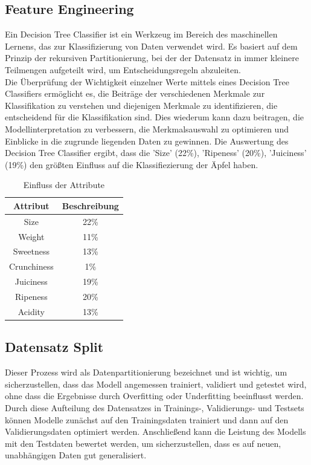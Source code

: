 \documentclass{article}
\begin{document}
\subsection{Feature Engineering}
Ein Decision Tree Classifier ist ein Werkzeug im Bereich des maschinellen Lernens, das zur Klassifizierung von Daten verwendet wird. Es basiert auf dem Prinzip der rekursiven Partitionierung, bei der der Datensatz in immer kleinere Teilmengen aufgeteilt wird, um Entscheidungsregeln abzuleiten.\\ 
Die Überprüfung der Wichtigkeit einzelner Werte mittels eines Decision Tree Classifiers ermöglicht es, die Beiträge der verschiedenen Merkmale zur Klassifikation zu verstehen und diejenigen Merkmale zu identifizieren, die entscheidend für die Klassifikation sind. Dies wiederum kann dazu beitragen, die Modellinterpretation zu verbessern, die Merkmalsauswahl zu optimieren und Einblicke in die zugrunde liegenden Daten zu gewinnen. Die Auswertung des Decision Tree Classifier ergibt, dass die 'Size' (22\%), 'Ripeness' (20\%), 'Juiciness' (19\%) den größten Einfluss auf die Klassifiezierung der Äpfel haben. 
\begin{table}[h]
\centering
\begin{tabular}{|c|c|}
\hline
\textbf{Attribut} & \textbf{Beschreibung} \\
\hline
Size & 22\% \\
Weight & 11\% \\
Sweetness & 13\% \\
Crunchiness & 1\% \\
Juiciness & 19\% \\
Ripeness & 20\% \\
Acidity & 13\% \\
\hline
\end{tabular}
\caption{Einfluss der Attribute}
\end{table}

\subsection{Datensatz Split}
Dieser Prozess wird als Datenpartitionierung bezeichnet und ist wichtig, um sicherzustellen, dass das Modell angemessen trainiert, validiert und getestet wird, ohne dass die Ergebnisse durch Overfitting oder Underfitting beeinflusst werden. Durch diese Aufteilung des Datensatzes in Trainings-, Validierungs- und Testsets können Modelle zunächst auf den Trainingsdaten trainiert und dann auf den Validierungsdaten optimiert werden. Anschließend kann die Leistung des Modells mit den Testdaten bewertet werden, um sicherzustellen,  dass es auf neuen, unabhängigen Daten gut generalisiert.
\end{document}
